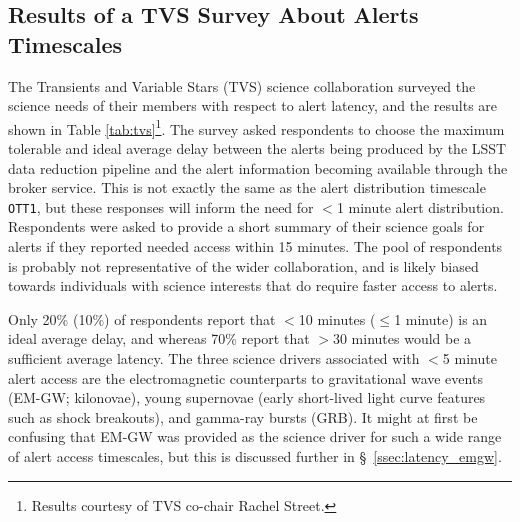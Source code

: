\documentclass[DM,lsstdraft,authoryear,toc]{lsstdoc}
\begin{document}
\subsection{Results of a TVS Survey About Alerts Timescales}\label{ssec:latency_tvs}

The Transients and Variable Stars (TVS) science collaboration surveyed the science needs of their members with respect to alert latency, and the results are shown in Table \ref{tab:tvs}\footnote{Results courtesy of TVS co-chair Rachel Street.}. The survey asked respondents to choose the maximum tolerable and ideal average delay between the alerts being produced by the LSST data reduction pipeline and the alert information becoming available through the broker service. This is not exactly the same as the alert distribution timescale {\tt OTT1}, but these responses will inform the need for $<$1 minute alert distribution.  Respondents were asked to provide a short summary of their science goals for alerts if they reported needed access within 15 minutes. The pool of respondents is probably not representative of the wider collaboration, and is likely biased towards individuals with science interests that do require faster access to alerts. 

Only 20\% (10\%) of respondents report that $<$10 minutes ($\leq$1 minute) is an ideal average delay, and whereas 70\% report that $>$30 minutes would be a sufficient average latency. The three science drivers associated with $<$5 minute alert access are the electromagnetic counterparts to gravitational wave events (EM-GW; kilonovae), young supernovae (early short-lived light curve features such as shock breakouts), and gamma-ray bursts (GRB). It might at first be confusing that EM-GW was provided as the science driver for such a wide range of alert access timescales, but this is discussed further in \S~\ref{ssec:latency_emgw}.
\end{document}

